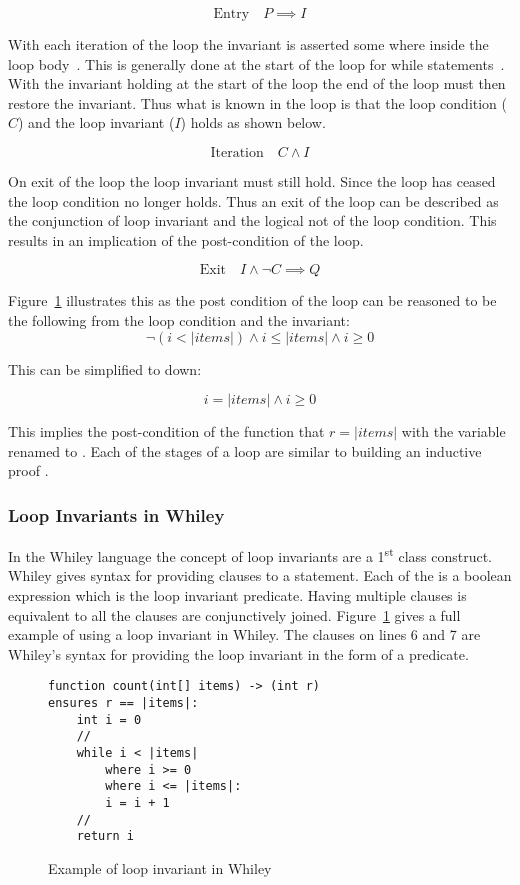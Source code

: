 $$\text{Entry} \quad P \implies I$$

With each iteration of the loop the invariant is asserted some where
inside the loop body~\cite{hoare-logic}.
This is generally done at the start of the loop for while
statements~\cite{whiley-origin}.
With the invariant holding at the start of the loop the end of 
the loop must then restore the invariant.
Thus what is known in the loop is that the loop condition ($C$)
and the loop invariant ($I$) holds as shown below.

$$\text{Iteration} \quad C \wedge I $$

On exit of the loop the loop invariant must still hold.
Since the loop has ceased the loop condition no longer
holds. Thus an exit of the loop can be described
as the conjunction of loop invariant and the logical
not of the loop condition.
This results in an implication of the post-condition of the
loop.

$$\text{Exit} \quad I \wedge \neg{C} \implies Q$$

Figure~\ref{lst:whiley-inv} illustrates this as the
post condition of the loop can be reasoned to be the following
from the loop condition and the invariant:
$$\neg{ ( i < |items| ) } \wedge i \leq |items| \wedge i \geq 0$$

This can be simplified to down:

$$ i = |items| \wedge i \geq 0$$

This implies the post-condition of the function that $r = |items|$ with
the variable  renamed to .
Each of the stages of a loop are similar to building an inductive proof \cite{invarints-classifiction}.

\subsubsection{Loop Invariants in Whiley}

In the Whiley language the concept of loop invariants are a 1\textsuperscript{st} class
construct.
Whiley gives syntax for providing  clauses to a 
statement.
Each of the  is a boolean expression which is the loop
invariant predicate.
Having multiple  clauses is equivalent to all the clauses are
conjunctively joined.
Figure~\ref{lst:whiley-inv} gives a full example of using a loop invariant
in Whiley. The  clauses on lines 6 and 7 are Whiley's syntax for
providing the loop invariant in the form of a predicate.

\begin{figure}[ht]
\begin{lstlisting}
function count(int[] items) -> (int r)
ensures r == |items|:
    int i = 0
    //
    while i < |items|
        where i >= 0
        where i <= |items|:
        i = i + 1
    //
    return i
\end{lstlisting}
\caption{Example of loop invariant in Whiley}
\label{lst:whiley-inv}
\end{figure}

